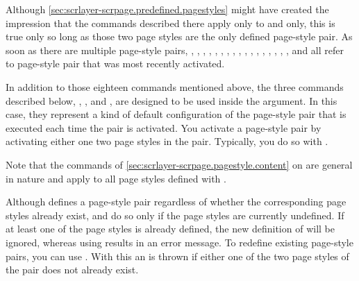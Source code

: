 Although \autoref{sec:scrlayer-scrpage.predefined.pagestyles} might have
created the impression that the commands described there apply only to
 and  only, this is true
only so long as those two page styles are the only defined page-style pair. As
soon as there are multiple page-style pairs,
, ,
, ,
, ,
, ,
, ,
, ,
, ,
, ,
, and 
all refer to page-style pair that was most recently activated.

In addition to those eighteen commands mentioned above, the three commands
described below, ,
, and
, are designed to be used inside
the  argument. In this case, they represent a kind of
default configuration of the page-style pair that is executed each time the
pair is activated. You activate a page-style pair by activating either one two
page styles in the pair. Typically, you do so with
.

Note that the commands of \autoref{sec:scrlayer-scrpage.pagestyle.content} on
 are general in nature and
apply to all page styles defined with .

Although  defines a page-style pair regardless of
whether the corresponding page styles already exist,
 and  do so only if
the page styles are currently undefined. If at least one of the page styles is
already defined, the new definition of  will be
ignored, whereas using  results in an error
message. To redefine existing page-style pairs, you can use
. With this an is thrown if either one of the two
page styles of the pair does not already exist.%
\EndIndexGroup


